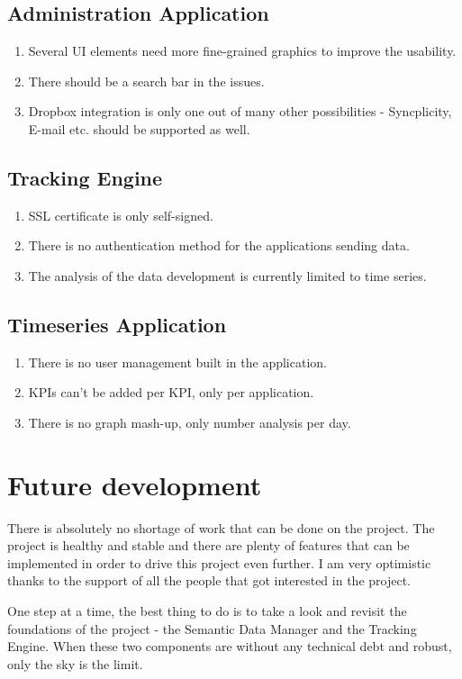 \subsection{Administration Application}

\begin{enumerate}
	\item Several UI elements need more fine-grained graphics to improve the usability.
	\item There should be a search bar in the issues.
	\item Dropbox integration is only one out of many other possibilities - Syncplicity, E-mail etc. should be supported as well.
\end{enumerate}

\subsection{Tracking Engine}

\begin{enumerate}
	\item SSL certificate is only self-signed.
	\item There is no authentication method for the applications sending data.
	\item The analysis of the data development is currently limited to time series.
\end{enumerate}

\subsection{Timeseries Application}

\begin{enumerate}
	\item There is no user management built in the application.
	\item KPIs can't be added per KPI, only per application.
	\item There is no graph mash-up, only number analysis per day.
\end{enumerate}

\section{Future development}

There is absolutely no shortage of work that can be done on the project. The project is healthy and stable and there are plenty of features that can be implemented in order to drive this project even further. I am very optimistic thanks to the support of all the people that got interested in the project. 

One step at a time, the best thing to do is to take a look and revisit the foundations of the project - the Semantic Data Manager and the Tracking Engine. When these two components are without any technical debt and robust, only the sky is the limit.
